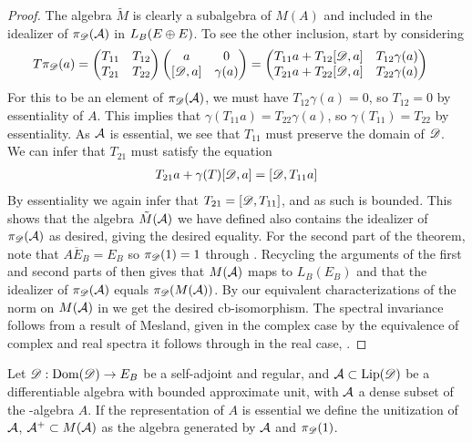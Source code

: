 \begin{proof}
	The algebra $\tilde{M}$ is clearly a subalgebra of $M(A)$ and included in the idealizer of $\pi_{\mathscr{D}}(\mathcal{A})$ in $L_B(E\oplus E)$. To see the other inclusion, start by considering
	\begin{align*}
		T\pi_\D(a)&=\begin{pmatrix} T_{11} & T_{12} \\ T_{21} & T_{22} \end{pmatrix} \begin{pmatrix}a & 0 \\ [\D,a] & \gamma(a) \end{pmatrix}
		=\begin{pmatrix} T_{11}a+T_{12}[\D,a] & T_{12}\gamma(a) \\ T_{21}a+T_{22}[\D,a] & T_{22}\gamma(a) \end{pmatrix}
	\end{align*}
	For this to be an element of $\pi_{\mathscr{D}}(\mathcal{A})$, we must have $T_{12}\gamma(a)=0$, so $T_{12}=0$ by essentiality of $A$. This implies that $\gamma(T_{11}a)=T_{22}\gamma(a)$, so $\gamma(T_{11})=T_{22}$ by essentiality. 
	As $\mathcal{A}$ is essential, we see that $T_{11}$ must preserve the domain of $\mathscr{D}$. We can infer that $T_{21}$ must satisfy the equation \begin{align*} T_{21}a+\gamma(T)[\mathscr{D},a]=[\mathscr{D},T_{11}a]\end{align*} By essentiality we again infer that $T_{21}=[\mathscr{D},T_{11}]$, and as such is bounded. This shows that the algebra $\tilde{M}(\mathcal{A})$ we have defined also contains the idealizer of $\pi_{\mathscr{D}}(\mathcal{A})$ as desired, giving the desired equality. 
	\newline
	For the second part of the theorem, note that $\overline{AE_B}=E_B$ so $\pi_{\mathscr{D}}(1)=1$ through . Recycling the arguments of the first and second parts of  then gives that $M(\mathcal{A})$ maps to $L_B(E_B)$ and that the idealizer of $\pi_{\mathscr{D}}(\mathcal{A})$ equals $\pi_{\mathscr{D}}(M(\mathcal{A}))$. By our equivalent characterizations of the norm on $M(\mathcal{A})$ in  we get the desired cb-isomorphism. 
	The spectral invariance follows from a result of Mesland, given in the complex case by the equivalence of complex and real spectra it follows through in the real case, \cite[Theorem B.3]{mesland}. 
\end{proof}
\begin{definition}
	Let $\mathscr{D}:\operatorname{Dom}(\mathscr{D})\to E_B$ be a self-adjoint and regular, and $\mathcal{A}\subset \operatorname{Lip} (\mathscr{D})$ be a differentiable algebra with bounded approximate unit, with $\mathcal{A}$ a dense subset of the \Cstar-algebra $A$. If the representation of $A$ is essential we define the unitization of $\mathcal{A}$, $\mathcal{A}^+ \subset M(\mathcal{A})$ as the algebra generated by $\mathcal{A}$ and $\pi_{\mathscr{D}}(1)$.
\end{definition}
